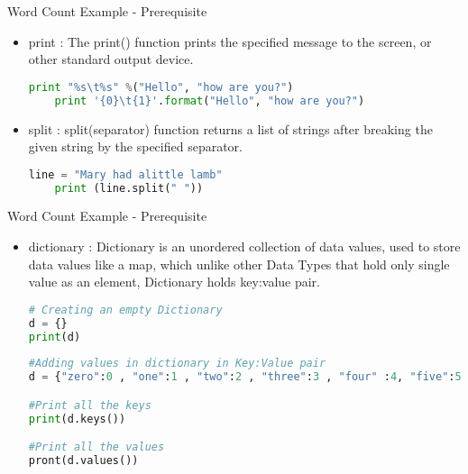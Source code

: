 \documentclass[pdf]{beamer}
\begin{document}
\begin{frame}[fragile]{Word Count Example - Prerequisite}
\begin{itemize}
	\item print : The print() function prints the specified message to the screen, or other standard output device.
\begin{lstlisting}[language=python]
	print "%s\t%s" %("Hello", "how are you?")
	print '{0}\t{1}'.format("Hello", "how are you?")
\end{lstlisting}

	\item split : split(separator) function returns a list of strings after breaking the given string by the specified separator.

\begin{lstlisting}[language=python]
	line = "Mary had alittle lamb"
	print (line.split(" "))
\end{lstlisting}

\end{itemize}		
\end{frame}


\begin{frame}[fragile]{Word Count Example - Prerequisite}
\begin{itemize}
	\item dictionary : Dictionary is an unordered collection of data values, used to store data values like a map, which unlike other Data Types that hold only single value as an element, Dictionary holds key:value pair. 
\begin{lstlisting}[language=python]
# Creating an empty Dictionary 
d = {} 
print(d) 
  
#Adding values in dictionary in Key:Value pair
d = {"zero":0 , "one":1 , "two":2 , "three":3 , "four" :4, "five":5, "six":6, "seven":7, "eight":8, "nine":9 }

#Print all the keys
print(d.keys())

#Print all the values
pront(d.values())
\end{lstlisting}
\end{itemize}		
\end{frame}
\end{document}
